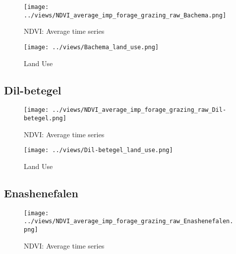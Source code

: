 \documentclass[10pt,a4paper,onecolumn]{article}
\begin{document}
\begin{figure}[H] \centering
  \captionsetup{justification=centering}
\caption{NDVI: Average time series } 
\centering


\texttt{[image: ../views/NDVI\_average\_imp\_forage\_grazing\_raw\_Bachema.png]}

\end{figure}

\begin{figure}[H] \centering
  \captionsetup{justification=centering}
\caption{Land Use} 
\centering


\texttt{[image: ../views/Bachema\_land\_use.png]}

\end{figure}




\pagebreak


\subsection{Dil-betegel}
\begin{figure}[H] \centering
  \captionsetup{justification=centering}
\caption{NDVI: Average time series } 
\centering


\texttt{[image: ../views/NDVI\_average\_imp\_forage\_grazing\_raw\_Dil-betegel.png]}

\end{figure}


\begin{figure}[H] \centering
  \captionsetup{justification=centering}
\caption{Land Use} 
\centering


\texttt{[image: ../views/Dil-betegel\_land\_use.png]}

\end{figure}



\pagebreak


\subsection{Enashenefalen}
\begin{figure}[H] \centering
  \captionsetup{justification=centering}
\caption{NDVI: Average time series } 
\centering


\texttt{[image: ../views/NDVI\_average\_imp\_forage\_grazing\_raw\_Enashenefalen.png]}

\end{figure}
\end{document}
